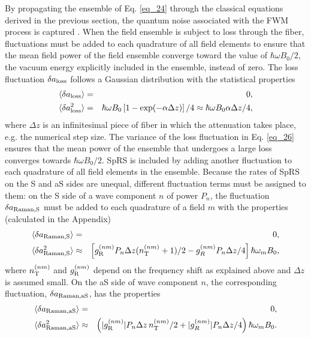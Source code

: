 \documentclass[10pt,letterpaper]{article}
\begin{document}
By propagating the ensemble of Eq. \eqref{eq_24} through the classical equations derived in the previous section, the quantum noise associated with the FWM process is captured \cite{Gordon_1963}. When the field ensemble is subject to loss through the fiber, fluctuations must be added to each quadrature of all field elements to ensure that the mean field power of the field ensemble converge toward the value of $\hbar \omega B_0/2$, the vacuum energy explicitly included in the ensemble, instead of zero. The loss fluctuation $\delta a_{\rm loss}$ follows a Gaussian distribution with the statistical properties \cite{Friis_2013}
\begin{eqnarray} \label{eq_35}
\langle \delta a_{\rm loss} \rangle &=& 0,\\
\langle \delta a_{\rm loss}^2 \rangle &=& \hbar \omega B_0\left[1-\exp(-\alpha \Delta z)\right]/4 \approx \hbar \omega B_0 \alpha \Delta z/4, \label{eq_26}
\end{eqnarray}
where $\Delta z$ is an infinitesimal piece of fiber in which the attenuation takes place, e.g. the numerical step size. The variance of the loss fluctuation in Eq. \eqref{eq_26} ensures that the mean power of the ensemble that undergoes a large loss converges towards $\hbar \omega B_0/2$. SpRS is included by adding another fluctuation to each quadrature of all field elements in the ensemble. Because the rates of SpRS on the S and aS sides are unequal, different fluctuation terms must be assigned to them: on the S side of a wave component $n$ of power $P_n$, the fluctuation $\delta a_{\rm Raman,S}$ must be added to each quadrature of a field $m$ with the properties (calculated in the Appendix)
\begin{eqnarray}
\langle \delta a_{\rm Raman,S} \rangle &=& 0,\\
\langle \delta a_{\rm Raman,S}^2 \rangle &\approx & \left[g^{(nm)}_{\rm R} P_n \Delta z (n^{(nm)}_{\rm T}+1)/2 - g^{(nm)}_{R}P_n\Delta z/4\right]\hbar \omega_{m} B_0,
\end{eqnarray}
where $n^{(nm)}_{\rm T}$ and $g^{(nm)}_{\rm R}$ depend on the frequency shift as explained above and $\Delta z$ is assumed small. On the aS side of wave component $n$, the corresponding fluctuation, $\delta a_{\rm Raman,aS}$, has the properties
\begin{eqnarray}
\langle \delta a_{\rm Raman,aS} \rangle &=& 0,\\
\langle \delta a_{\rm Raman,aS}^2 \rangle &\approx & \left( |g^{(nm)}_{\rm R}|P_n \Delta z\, n^{(nm)}_{\rm T}/2 + |g^{(nm)}_{R}| P_n \Delta z/4\right) \hbar \omega_{m} B_0.
\end{eqnarray}
\end{document}
